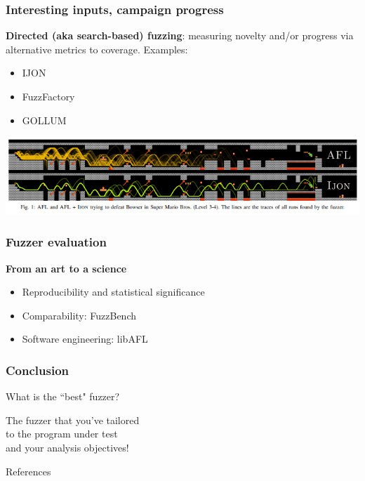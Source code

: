 \documentclass{beamer}
\begin{document}
\begin{frame}
	\frametitle{Interesting inputs, campaign progress}

	\textbf{Directed (aka search-based) fuzzing}: measuring novelty and/or progress via alternative metrics to coverage. Examples: \begin{itemize}
		\item{IJON \cite{ijon}}
		\item{FuzzFactory \cite{fuzzfactory}}
		\item{GOLLUM \cite{gollum}}
	\end{itemize}

	\vspace{\baselineskip}
	\centering \includegraphics[scale=.5]{ijon}
\end{frame}

\begin{frame}
	\frametitle{Fuzzer evaluation}
	\textbf{From an art to a science}

	\begin{itemize}
		\item{Reproducibility and statistical significance \cite{klees, seedselection}}
		\item{Comparability: FuzzBench \cite{fuzzbench}}
		\item{Software engineering: libAFL \cite{libafl}}
	\end{itemize}
	
\end{frame}

\begin{frame}
	\frametitle{Conclusion}

	\centering
	\LARGE{What is the ``best" fuzzer?}
	
	\vspace{\baselineskip}
	\pause
	\LARGE{The fuzzer that you've tailored \\to the program under test \\and your analysis objectives!} 
\end{frame}

\appendix
\begin{frame}[allowframebreaks]{References}
	\def\newblock{}
	
	
\end{frame}
\end{document}
